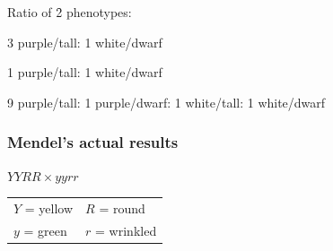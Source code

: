 {\begin{noheadline}
\begin{frame}[t]
    Ratio of \f{2} phenotypes:
    \begin{clickeroptions}
        \item 3 purple/tall: 1 white/dwarf
        \item 1 purple/tall: 1 white/dwarf
        \item 9 purple/tall: 1 purple/dwarf: 1 white/tall: 1 white/dwarf
        \item {}
    \end{clickeroptions}
\end{frame}
\end{noheadline}
}

\begin{frame}[t]
    \frametitle{Mendel's actual results}
    \begin{adjustwidth}{-1.5em}{-1.5em}
    \vspace{-5mm}
    \begin{center}
        $YYRR  \times yyrr$
    \end{center}
    \vspace{-1mm}
    \begin{table}%
        \centering
        \begin{tabular}{l l}
            $Y$ = yellow & $R$ = round \\
            $y$ = green & $r$ = wrinkled \\
        \end{tabular}
    \end{table}

    \vspace{-1mm}

    \vspace{1mm}


\end{adjustwidth}
\end{frame}
